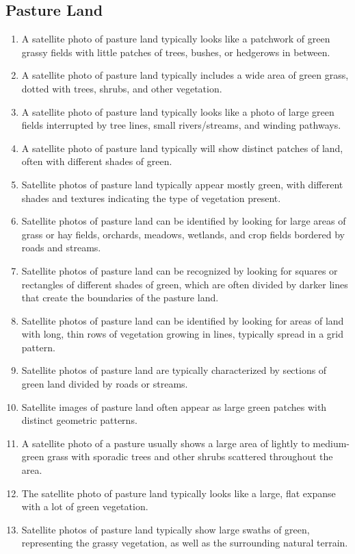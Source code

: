 \documentclass[11pt]{article}
\begin{document}
\subsection{Pasture Land}
\begin{enumerate}
\item A satellite photo of pasture land typically looks like a patchwork of green grassy fields with little patches of trees, bushes, or hedgerows in between.
\item A satellite photo of pasture land typically includes a wide area of green grass, dotted with trees, shrubs, and other vegetation.
\item A satellite photo of pasture land typically looks like a photo of large green fields interrupted by tree lines, small rivers/streams, and winding pathways.
\item A satellite photo of pasture land typically will show distinct patches of land, often with different shades of green.
\item Satellite photos of pasture land typically appear mostly green, with different shades and textures indicating the type of vegetation present.
\item Satellite photos of pasture land can be identified by looking for large areas of grass or hay fields, orchards, meadows, wetlands, and crop fields bordered by roads and streams.
\item Satellite photos of pasture land can be recognized by looking for squares or rectangles of different shades of green, which are often divided by darker lines that create the boundaries of the pasture land.
\item Satellite photos of pasture land can be identified by looking for areas of land with long, thin rows of vegetation growing in lines, typically spread in a grid pattern.
\item Satellite photos of pasture land are typically characterized by sections of green land divided by roads or streams.
\item Satellite images of pasture land often appear as large green patches with distinct geometric patterns.
\item A satellite photo of a pasture usually shows a large area of lightly to medium-green grass with sporadic trees and other shrubs scattered throughout the area.
\item The satellite photo of pasture land typically looks like a large, flat expanse with a lot of green vegetation.
\item Satellite photos of pasture land typically show large swaths of green, representing the grassy vegetation, as well as the surrounding natural terrain.

\end{enumerate}
\end{document}
